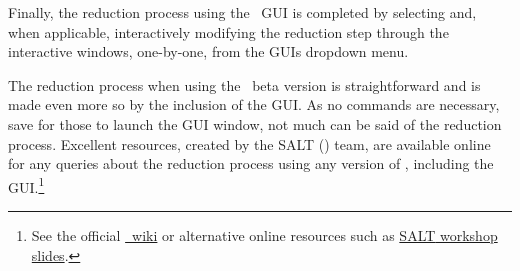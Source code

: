 Finally, the reduction process using the \polsalt\ \gls{GUI} is completed by selecting and, when applicable, interactively modifying the reduction step through the interactive windows, one-by-one, from the \glspl{GUI} dropdown menu.
\prgph

The reduction process when using the \polsalt\ beta version is straightforward and is made even more so by the inclusion of the \gls{GUI}. As no commands are necessary, save for those to launch the \gls{GUI} window, not much can be said of the reduction process. Excellent resources, created by the \gls{SALT} () team, are available online for any queries about the reduction process using any version of \polsalt, including the \gls{GUI}.\footnote{See the official \href{https://github.com/saltastro/polsalt/wiki}{\polsalt\ wiki} or alternative online resources such as \href{https://saltworkshop2022.salt.ac.za/wp-content/uploads/2022/11/DG_polsalt_SALT_workshop_2022_finalversion.pdf}{\gls{SALT} workshop slides}.}
